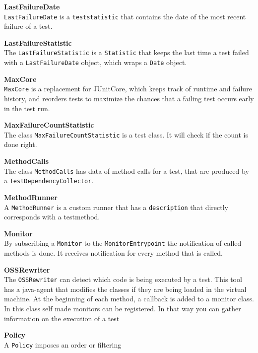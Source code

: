 \documentclass[i2]{oss}
\newcommand{\class}[1]{\texttt{#1}}
\newcommand{\gloss}[1]{\textbf{#1}}
\begin{document}
\begin{description}
\item \gloss{LastFailureDate} \\
\class{LastFailureDate} is a \class{teststatistic} that contains the date of the most recent failure of a test.

\item \gloss{LastFailureStatistic}\\
 The \class{LastFailureStatistic} is a \class{Statistic} that keeps the last time a test failed with a \class{LastFailureDate} object, which wraps a \class{Date} object.

\item \gloss{MaxCore} \\
\class{MaxCore} is a replacement for JUnitCore, which keeps track of runtime and failure history, and reorders tests to maximize the chances that a failing test occurs early in the test run.

\item \gloss{MaxFailureCountStatistic} \\
The class \class{MaxFailureCountStatistic} is a test class. It will check if the count is done right.

\item \gloss{MethodCalls} \\
The class \class{MethodCalls} has data of method calls for a test, that are produced by a \class{TestDependencyCollector}.

\item \gloss{MethodRunner}\\
A \class{MethodRunner} is a custom runner that has a \class{description} that directly corresponds with a testmethod.

\item \gloss{Monitor} \\
By subscribing a \class{Monitor} to the \class{MonitorEntrypoint} the notification of called methods is done. It receives notification for every method that is called.

\item \gloss{OSSRewriter}\\
The \class{OSSRewriter} can detect which code is being executed by a test. This tool has a java-agent that modifies the classes if they are being loaded in the virtual machine. At the beginning of each method, a callback is added to a monitor
class. In this class self made monitors can be registered. In that way you
can gather information on the execution of a test 

\item \gloss{Policy} \\
A \class{Policy} imposes an order or filtering 


\end{description}
\end{document}

